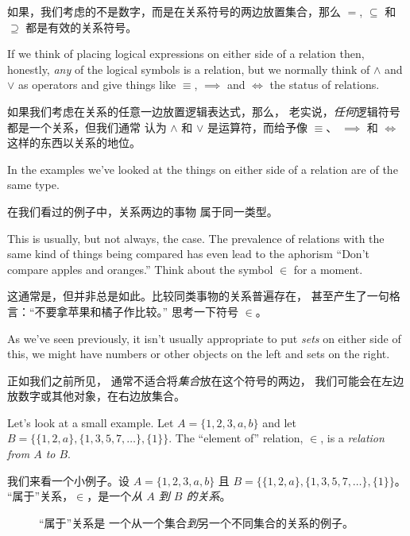 如果，我们考虑的不是数字，而是在关系符号的两边放置集合，那么
$=$, $\subseteq$ 和 $\supseteq$ 都是有效的关系符号。

If we think 
of placing logical expressions on either side of a relation then, 
honestly, \emph{any} of the logical symbols is a relation, but we normally
think of $\land$ and $\lor$ as operators and give things like $\equiv$, 
$\implies$ and $\iff$ the status of relations.

如果我们考虑在关系的任意一边放置逻辑表达式，那么，
老实说，\emph{任何}逻辑符号都是一个关系，但我们通常
认为 $\land$ 和 $\lor$ 是运算符，而给予像 $\equiv$、
$\implies$ 和 $\iff$ 这样的东西以关系的地位。

In the examples we've looked at the things on either side of a relation
are of the same type.

在我们看过的例子中，关系两边的事物
属于同一类型。

This is usually, but not always, the case.  The 
prevalence of relations with the same kind of things being compared has
even lead to the aphorism ``Don't compare apples and oranges.''  Think 
about the symbol $\in$ for a moment.

这通常是，但并非总是如此。比较同类事物的关系普遍存在，
甚至产生了一句格言：“不要拿苹果和橘子作比较。” 思考一下符号 $\in$。

As we've seen previously, it
isn't usually appropriate to put \emph{sets} on either side of this,
we might have numbers or other objects on the left and sets on the right.

正如我们之前所见，
通常不适合将\emph{集合}放在这个符号的两边，
我们可能会在左边放数字或其他对象，在右边放集合。

Let's look at a small example.  Let $A = \{1,2,3,a,b\}$ and let 
$B=\{ \{1,2,a\}, \{1,3,5,7,\ldots\}, \{1\} \}$.
The ``element of'' 
relation, $\in$, is a \emph{relation from $A$ to $B$}.

我们来看一个小例子。设 $A = \{1,2,3,a,b\}$ 且
$B=\{ \{1,2,a\}, \{1,3,5,7,\ldots\}, \{1\} \}$。
“属于”关系，$\in$，是一个\emph{从 $A$ 到 $B$ 的关系}。

\begin{figure}[!hbtp]

\caption[An example of a relation.]{The ``element of'' relation %
is an example of a relation that goes \emph{from} one set \emph{to} a %
different set.}
\caption[一个关系的例子。]{“属于”关系是
一个从一个集合\emph{到}另一个不同集合的关系的例子。}
\label{fig:rel1} 
\end{figure}

